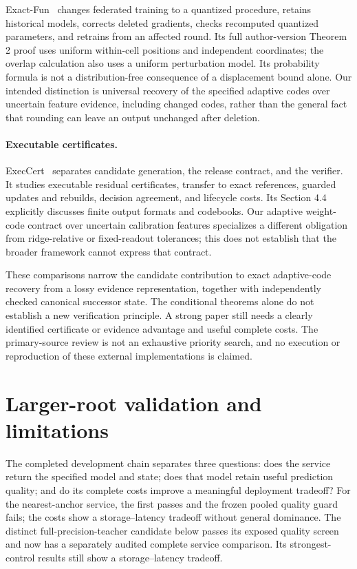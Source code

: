 \documentclass[10pt,twocolumn,letterpaper]{article}
\begin{document}
Exact-Fun~\cite{exactfun} changes federated training to a quantized procedure,
retains historical models, corrects deleted gradients, checks recomputed
quantized parameters, and retrains from an affected round. Its full author-version
Theorem 2 proof uses uniform within-cell positions and independent coordinates;
the overlap calculation also uses a uniform perturbation model. Its probability
formula is not a distribution-free consequence of a displacement bound alone.
Our intended distinction is universal recovery of the specified adaptive codes
over uncertain feature evidence, including changed codes, rather than the
general fact that rounding can leave an output unchanged after deletion.

\paragraph{Executable certificates.}
ExecCert~\cite{execcert} separates candidate generation, the release contract, and
the verifier. It studies executable residual certificates, transfer to exact
references, guarded updates and rebuilds, decision agreement, and lifecycle costs.
Its Section 4.4 explicitly discusses finite output formats and codebooks. Our
adaptive weight-code contract over uncertain calibration features specializes a
different obligation from ridge-relative or fixed-readout tolerances; this does
not establish that the broader framework cannot express that contract.

These comparisons narrow the candidate contribution to exact adaptive-code
recovery from a lossy evidence representation, together with independently
checked canonical successor state. The conditional theorems alone do not
establish a new verification principle. A strong paper still needs a clearly
identified certificate or evidence advantage and useful complete costs. The
primary-source review is not an exhaustive priority search, and no execution or
reproduction of these external implementations is claimed.

\section{Larger-root validation and limitations}
The completed development chain separates three questions: does the service
return the specified model and state; does that model retain useful prediction
quality; and do its complete costs improve a meaningful deployment tradeoff?
For the nearest-anchor service, the first passes and the frozen pooled quality
guard fails; the costs show a storage--latency tradeoff without general dominance.
The distinct full-precision-teacher candidate below passes its exposed quality
screen and now has a separately audited complete service comparison. Its
strongest-control results still show a storage--latency tradeoff.
\end{document}
